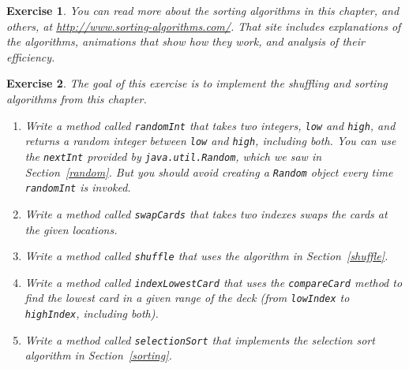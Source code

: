 \documentclass[12pt]{book}
\theoremstyle{exercise}
\newtheorem{exercise}{Exercise}[chapter]
\newcommand{\java}[1]{\verb"#1"}
\newcommand{\java}[1]{\lstinline{#1}} %
\begin{document}
\begin{exercise}
You can read more about the sorting algorithms in this chapter, and others, at \url{http://www.sorting-algorithms.com/}.
That site includes explanations of the algorithms, animations that show how they work, and analysis of their efficiency.
\end{exercise}


\begin{exercise}
The goal of this exercise is to implement the shuffling and sorting algorithms from this chapter.

\begin{enumerate}




\item Write a method called \java{randomInt} that takes two integers, \java{low} and \java{high}, and returns a random integer between \java{low} and \java{high}, including both.
You can use the \java{nextInt} provided by \java{java.util.Random}, which we saw in Section~\ref{random}.
But you should avoid creating a \java{Random} object every time \java{randomInt} is invoked.

\item Write a method called \java{swapCards} that takes two indexes swaps the cards at the given locations.

\item Write a method called \java{shuffle} that uses the algorithm in Section~\ref{shuffle}.

\item Write a method called \java{indexLowestCard} that uses the \java{compareCard} method to find the lowest card in a given range of the deck (from \java{lowIndex} to \java{highIndex}, including both).

\item Write a method called \java{selectionSort} that implements the selection sort algorithm in Section~\ref{sorting}.


\end{enumerate}
\end{exercise}
\end{document}
